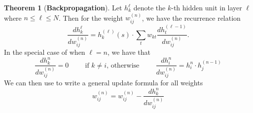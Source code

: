 \documentclass[12pt,letterpaper]{book}
\theoremstyle{definition}
\newtheorem{theorem}{Theorem}[section]
\begin{document}
    \begin{theorem}[\textbf{Backpropagation}]
      Let $h_{k}^{\ell}$ denote the $k$-th hidden unit in layer $\ell$ where $n \le \ell \le N$.
      Then for the weight $w^{(n)}_{ij}$, we have the recurrence relation 
      \[
        \frac{dh_k^{\ell}}{dw^{(n)}_{ij}}
        =
        h_k^{(\ell)}(s)
        \cdot
        \sum_{t}w_{kt}\frac{dh^{(\ell-1)}_t}{dw^{(n)}_{ij}}.
      \]
      In the special case of when
      $\ell = n$, we have that
      \[
        \frac{dh_k^{n}}{dw^{(n)}_{ij}} = 0
        \hspace{1cm} \text{if $k \ne i$, otherwise} \hspace{1cm} \frac{dh_i^{n}}{dw^{(n)}_{ij}} = h_i^n \cdot h_j^{(n -1)}
      \]
      We can then use to write a general update formula for all 
      weights
      \[
        w^{(n)}_{ij} = w^{(n)}_{ij} - \frac{dh_k^{n}}{dw^{(n)}_{ij}}
      \]
    \end{theorem}
\end{document}
